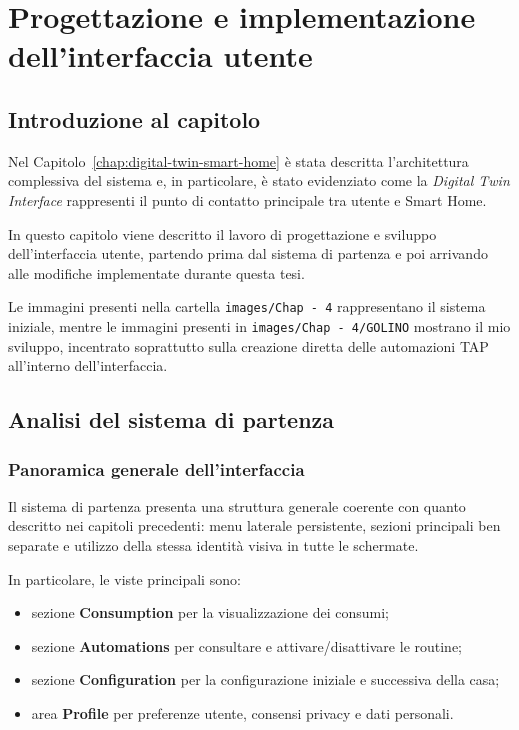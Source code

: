 \chapter{Progettazione e implementazione dell'interfaccia utente}
\label{chap:design-implementation}

\section{Introduzione al capitolo}
Nel Capitolo~\ref{chap:digital-twin-smart-home} è stata descritta l'architettura complessiva del sistema e, in particolare, è stato evidenziato come la \textit{Digital Twin Interface} rappresenti il punto di contatto principale tra utente e Smart Home.

In questo capitolo viene descritto il lavoro di progettazione e sviluppo dell'interfaccia utente, partendo prima dal sistema di partenza e poi arrivando alle modifiche implementate durante questa tesi.

Le immagini presenti nella cartella \texttt{images/Chap - 4} rappresentano il sistema iniziale, mentre le immagini presenti in \texttt{images/Chap - 4/GOLINO} mostrano il mio sviluppo, incentrato soprattutto sulla creazione diretta delle automazioni TAP all'interno dell'interfaccia.

\section{Analisi del sistema di partenza}
\subsection{Panoramica generale dell'interfaccia}
Il sistema di partenza presenta una struttura generale coerente con quanto descritto nei capitoli precedenti: menu laterale persistente, sezioni principali ben separate e utilizzo della stessa identità visiva in tutte le schermate.

In particolare, le viste principali sono:
\begin{itemize}
    \item sezione \textbf{Consumption} per la visualizzazione dei consumi;
    \item sezione \textbf{Automations} per consultare e attivare/disattivare le routine;
    \item sezione \textbf{Configuration} per la configurazione iniziale e successiva della casa;
    \item area \textbf{Profile} per preferenze utente, consensi privacy e dati personali.
\end{itemize}

